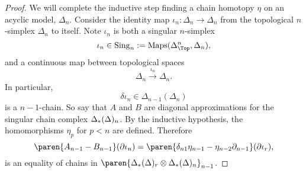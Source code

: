 \documentclass[onesided]{ccg-pset}
\begin{document}
\begin{enumerate}
\begin{proof}
   We will complete the inductive step finding a chain homotopy $\eta$ on an {acyclic model}, $\Delta_n$. Consider the identity map $\iota_n \colon \Delta_n \to \Delta_n$ from the topological $n$-simplex $\Delta_n$ to itself. Note $\iota_n$ is both a singular $n$-simplex 
   \[\iota_n \in \sing \Delta_n := \mathrm{Maps}(\Delta^n_\Top, \Delta_n),\] and a continuous map between topological spaces 
   \[
      \Delta_n \xrightarrow{\iota_n} \Delta_n.
   \]
   In particular, \[\delta \iota_n \in \Delta_{n-1}(\Delta_n)\] is a $n-1$-chain. 
   So say that $A$ and $B$ are diagonal approximations for the singular chain complex $\Delta_{*}(\Delta)_n$.
   By the inductive hypothesis, the homomorphisms $\eta_p$ for $p < n$ are defined. Therefore
   \begin{equation}
      \label{indhypo}
      \paren{A_{n-1} - B_{n-1}}(\partial\iota_n) = \paren{\delta_{n1} \eta_{n-1} - \eta_{n-2} \partial_{n-1}}(\partial \iota_r),
   \end{equation}
   is an equality of chains in $\paren{\sich * \Delta_r \otimes \sich * \Delta_n}_{n-1}$. 
\end{proof}

\end{enumerate}
\end{document}
